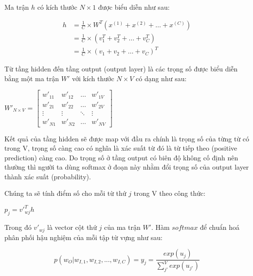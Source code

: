 Ma trận $h$ có kích thước $N\times 1$ được biểu diễn như sau: 

\begin{center}
    \begin{equation}
    \begin{split}
        h & = \frac{1}{C} \times W^T \left( x^{(1)} + x^{(2)} + \dots + x^{(C)} \right) \\
        & = \frac{1}{C} \times \left( v^T_{1} + v^T_{2} + \dots + v^T_{C} \right) \\
        & = \frac{1}{C} \times \left( v_{1} + v_{2} + \dots + v_{C} \right)^T
    \end{split}
    \end{equation}
\end{center}

Từ tầng hidden đến tầng output (output layer) là các trọng số được biểu diễn bằng một ma trận $W'$ với kích thước $N\times V$ có dạng như sau:
\begin{center}
    $W'_{N\times V}$ =
    $\begin{bmatrix}
        w'_{11} & w'_{12} & \dots & w'_{1V}\\
        w'_{21} & w'_{22} & \dots & w'_{2V} \\
        \vdots & \vdots & \ddots & \vdots \\
        w'_{N1} & w'_{N2} & \dots & w'_{NV}
    \end{bmatrix}$
\end{center}

Kết quả của tầng hidden sẽ được map với đầu ra chính là trọng số của từng từ có trong V, trọng số càng cao có nghĩa là xác suất từ đó là từ tiếp theo (positive prediction) càng cao. Do trọng số ở tầng output có biên độ không cố định nên thường thì người ta dùng softmax ở đoạn này nhằm  đổi trọng số của output layer thành xác suất (probability).

Chúng ta sẽ tính điểm số cho mỗi từ thứ $j$ trong V theo công thức:
\begin{center}
    $p_{j} = v'^T_{wj}h$
\end{center}

Trong đó $v'_{wj}$ là vector cột thứ $j$ của ma trận $W'$. Hàm $softmax$ để chuẩn hoá phân phối hậu nghiệm của mỗi tập từ vựng như sau:
\begin{center}
    \begin{equation}
        p\left( w_{O} | w_{I,1},w_{I,2}, ..., w_{I,C} \right) = y_{j} = \frac{exp(u_{j})}{\sum_{j'}^{V}exp(u_{j'})}
    \end{equation}
\end{center}

